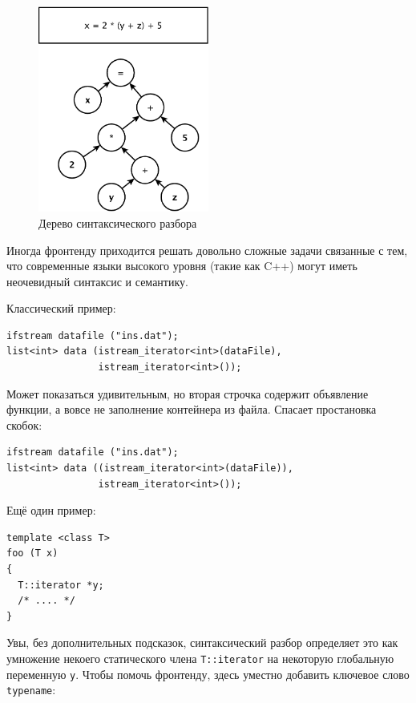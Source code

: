 \documentclass[a4paper,12pt,oneside]{article}
\begin{document}
\begin{figure}[ht]
\centering
\includegraphics[width=0.5\textwidth]{illustrations/ast-example-crop.pdf}
\caption{Дерево синтаксического разбора}
\label{fig:ast_scheme}
\end{figure}

Иногда фронтенду приходится решать довольно сложные задачи связанные с тем, что современные языки высокого уровня (такие как C++) могут иметь неочевидный синтаксис и семантику.

Классический пример:

\begin{lstlisting}
ifstream datafile ("ins.dat");
list<int> data (istream_iterator<int>(dataFile),
                istream_iterator<int>());
\end{lstlisting}

Может показаться удивительным, но вторая строчка содержит объявление функции, а вовсе не заполнение контейнера из файла. Спасает простановка скобок:

\begin{lstlisting}
ifstream datafile ("ins.dat");
list<int> data ((istream_iterator<int>(dataFile)),
                istream_iterator<int>());
\end{lstlisting}

Ещё один пример:

\begin{lstlisting}
template <class T>
foo (T x)
{
  T::iterator *y;
  /* .... */
}
\end{lstlisting}

Увы, без дополнительных подсказок, синтаксический разбор определяет это как умножение некоего статического члена \lstinline!T::iterator! на некоторую глобальную переменную \lstinline!y!. Чтобы помочь фронтенду, здесь уместно добавить ключевое слово \lstinline!typename!:
\end{document}
